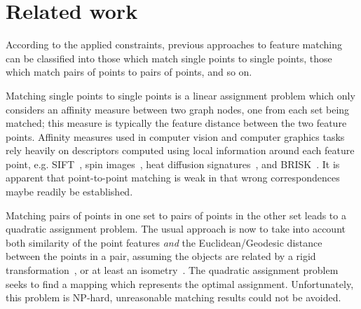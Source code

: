 \section{Related work}
\label{sec:related}

According to the applied constraints,
previous approaches to feature matching can be classified into those which match single points to single points, those which match pairs of points to pairs of points, and so on.

Matching single points to single points is a linear assignment problem which only considers an affinity measure between two graph nodes, one from each set being matched;
this measure is typically the feature distance between the two feature points.
Affinity measures used in computer vision and computer graphics tasks rely heavily on descriptors computed using local information around each feature point,
e.g. SIFT~\cite{Lowe04}, spin images~\cite{Johnson99}, heat diffusion signatures~\cite{Sun09}, and BRISK~\cite{Leutenegger11}.
It is apparent that point-to-point matching is weak in that wrong correspondences maybe readily be established.

Matching pairs of points in one set to pairs of points in the other set leads to a quadratic assignment problem.
The usual approach is now to take into account both similarity of the point features \emph{and} the Euclidean/Geodesic distance between the points in a pair,
assuming the objects are related by a rigid transformation~\cite{Leordeanu05}, or at least an isometry~\cite{li08,Tevs09,Ovsjanikov10,Tevs11,SahilliogluY11,Windheuser11}.
The quadratic assignment problem seeks to find a mapping which represents the optimal assignment.
Unfortunately, this problem is NP-hard, unreasonable matching results could not be avoided.

